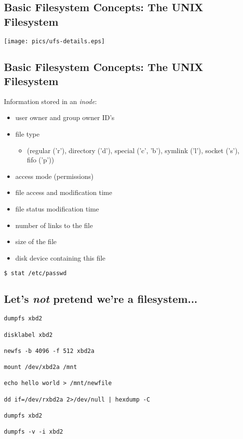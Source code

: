 \documentclass[xga]{xdvislides}
\begin{document}
\subsection{Basic Filesystem Concepts: The UNIX Filesystem}
\begin{center}
	\texttt{[image: pics/ufs-details.eps]} \\
\end{center}
\vspace*{\fill}

\subsection{Basic Filesystem Concepts: The UNIX Filesystem}
Information stored in an {\em inode}:
\begin{itemize}
	\item user owner and group owner ID's
	\item file type
		\begin{itemize}
			\item (regular ('r'), directory ('d'), special ('c', 'b'), symlink ('l'), socket ('s'), fifo ('p'))
		\end{itemize}
	\item access mode (permissions)
	\item file access and modification time
	\item file status modification time
	\item number of links to the file
	\item size of the file
	\item disk device containing this file
\end{itemize}

\begin{verbatim}
$ stat /etc/passwd
\end{verbatim}

\subsection{Let's {\em not} pretend we're a filesystem...}
\begin{verbatim}
dumpfs xbd2

disklabel xbd2

newfs -b 4096 -f 512 xbd2a

mount /dev/xbd2a /mnt

echo hello world > /mnt/newfile

dd if=/dev/rxbd2a 2>/dev/null | hexdump -C

dumpfs xbd2

dumpfs -v -i xbd2
\end{verbatim}
\end{document}
